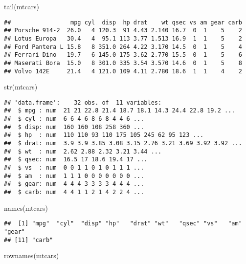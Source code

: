 \documentclass[
]{article}
\newenvironment{Shaded}{\begin{snugshade}}{\end{snugshade}}
\newcommand{\FunctionTok}[1]{\textcolor[rgb]{0.00,0.00,0.00}{#1}}
\newcommand{\NormalTok}[1]{#1}
\begin{document}
\begin{Shaded}
\begin{Highlighting}[]
\FunctionTok{tail}\NormalTok{(mtcars)}
\end{Highlighting}
\end{Shaded}

\begin{verbatim}
##                 mpg cyl  disp  hp drat    wt qsec vs am gear carb
## Porsche 914-2  26.0   4 120.3  91 4.43 2.140 16.7  0  1    5    2
## Lotus Europa   30.4   4  95.1 113 3.77 1.513 16.9  1  1    5    2
## Ford Pantera L 15.8   8 351.0 264 4.22 3.170 14.5  0  1    5    4
## Ferrari Dino   19.7   6 145.0 175 3.62 2.770 15.5  0  1    5    6
## Maserati Bora  15.0   8 301.0 335 3.54 3.570 14.6  0  1    5    8
## Volvo 142E     21.4   4 121.0 109 4.11 2.780 18.6  1  1    4    2
\end{verbatim}

\begin{Shaded}
\begin{Highlighting}[]
\FunctionTok{str}\NormalTok{(mtcars)}
\end{Highlighting}
\end{Shaded}

\begin{verbatim}
## 'data.frame':    32 obs. of  11 variables:
##  $ mpg : num  21 21 22.8 21.4 18.7 18.1 14.3 24.4 22.8 19.2 ...
##  $ cyl : num  6 6 4 6 8 6 8 4 4 6 ...
##  $ disp: num  160 160 108 258 360 ...
##  $ hp  : num  110 110 93 110 175 105 245 62 95 123 ...
##  $ drat: num  3.9 3.9 3.85 3.08 3.15 2.76 3.21 3.69 3.92 3.92 ...
##  $ wt  : num  2.62 2.88 2.32 3.21 3.44 ...
##  $ qsec: num  16.5 17 18.6 19.4 17 ...
##  $ vs  : num  0 0 1 1 0 1 0 1 1 1 ...
##  $ am  : num  1 1 1 0 0 0 0 0 0 0 ...
##  $ gear: num  4 4 4 3 3 3 3 4 4 4 ...
##  $ carb: num  4 4 1 1 2 1 4 2 2 4 ...
\end{verbatim}

\begin{Shaded}
\begin{Highlighting}[]
\FunctionTok{names}\NormalTok{(mtcars)}
\end{Highlighting}
\end{Shaded}

\begin{verbatim}
##  [1] "mpg"  "cyl"  "disp" "hp"   "drat" "wt"   "qsec" "vs"   "am"   "gear"
## [11] "carb"
\end{verbatim}

\begin{Shaded}
\begin{Highlighting}[]
\FunctionTok{rownames}\NormalTok{(mtcars)}
\end{Highlighting}
\end{Shaded}
\end{document}
